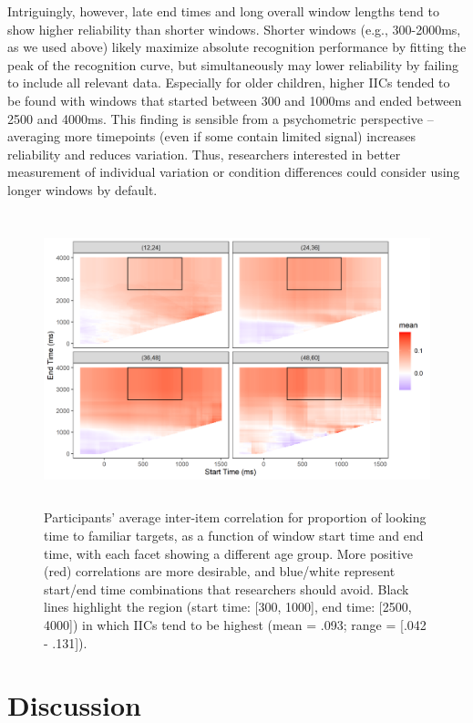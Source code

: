 \documentclass[10pt, letterpaper]{article}
\begin{document}
Intriguingly, however, late end times and long overall window lengths
tend to show higher reliability than shorter windows. Shorter windows
(e.g., 300-2000ms, as we used above) likely maximize absolute
recognition performance by fitting the peak of the recognition curve,
but simultaneously may lower reliability by failing to include all
relevant data. Especially for older children, higher IICs tended to be
found with windows that started between 300 and 1000ms and ended between
2500 and 4000ms. This finding is sensible from a psychometric
perspective -- averaging more timepoints (even if some contain limited
signal) increases reliability and reduces variation. Thus, researchers
interested in better measurement of individual variation or condition
differences could consider using longer windows by default.

\begin{figure} 
\includegraphics[width=13.6cm,height=8.5cm]{../figures/interitem_cors_window_analysis.png}
\caption{Participants' average inter-item correlation for proportion of looking time to familiar targets, as a function of window start time and end time, with each facet showing a different age group. More positive (red) correlations are more desirable, and blue/white represent start/end time combinations that researchers should avoid. Black lines highlight the region (start time: [300, 1000], end time: [2500, 4000]) in which IICs tend to be highest (mean = .093; range = [.042 - .131]).}
\label{fig:time_window}
\end{figure}

\hypertarget{discussion}{%
\section{Discussion}\label{discussion}}
\end{document}
